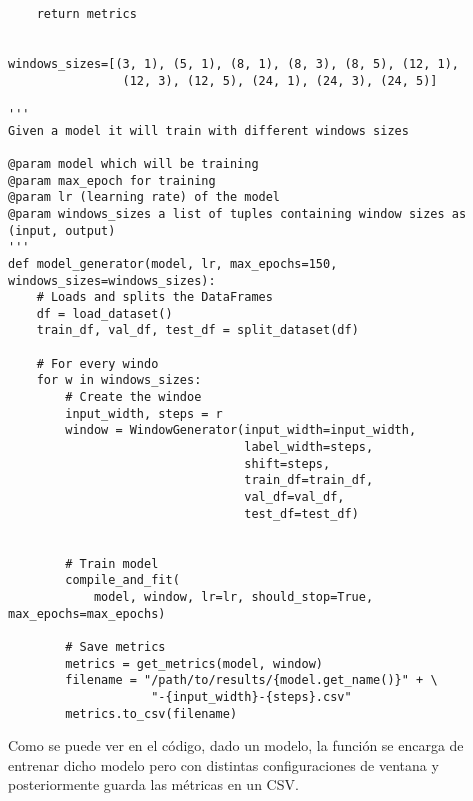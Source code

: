 \begin{verbatim}
    return metrics


windows_sizes=[(3, 1), (5, 1), (8, 1), (8, 3), (8, 5), (12, 1), 
                (12, 3), (12, 5), (24, 1), (24, 3), (24, 5)]

'''
Given a model it will train with different windows sizes

@param model which will be training
@param max_epoch for training
@param lr (learning rate) of the model
@param windows_sizes a list of tuples containing window sizes as (input, output)
'''
def model_generator(model, lr, max_epochs=150, windows_sizes=windows_sizes):
    # Loads and splits the DataFrames
    df = load_dataset()
    train_df, val_df, test_df = split_dataset(df)
    
    # For every windo
    for w in windows_sizes:
        # Create the windoe
        input_width, steps = r
        window = WindowGenerator(input_width=input_width,
                                 label_width=steps,
                                 shift=steps,
                                 train_df=train_df,
                                 val_df=val_df,
                                 test_df=test_df)

        
        # Train model
        compile_and_fit(
            model, window, lr=lr, should_stop=True, max_epochs=max_epochs)
        
        # Save metrics
        metrics = get_metrics(model, window)
        filename = "/path/to/results/{model.get_name()}" + \
                    "-{input_width}-{steps}.csv"
        metrics.to_csv(filename)
\end{verbatim}


Como se puede ver en el código, dado un modelo, la función se encarga de entrenar dicho modelo pero con distintas configuraciones de ventana y posteriormente guarda las métricas en un CSV. 